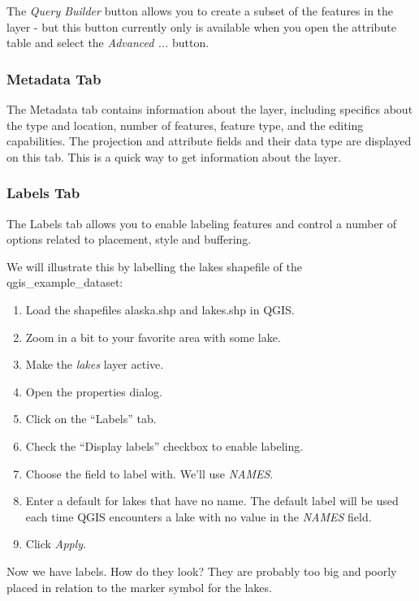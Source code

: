 The \textsl{Query Builder} button allows you to create a subset of the features 
in the layer - but this button currently only is available when you open the 
attribute table and select the \textsl{Advanced ...} button.

\subsubsection{Metadata Tab}

The Metadata tab contains information about the layer, including specifics
about the type and location, number of features, feature type, and the editing
capabilities. The projection and attribute fields and their data type are displayed 
on this tab. This is a quick way to get information about the layer.

\subsubsection{Labels Tab}

The Labels tab allows you to enable labeling features and control a number of
options related to placement, style and buffering.

We will illustrate this by labelling the lakes shapefile of the qgis\_example\_dataset:

\begin{enumerate}
\item Load the shapefiles alaska.shp and lakes.shp in QGIS.
\item Zoom in a bit to your favorite area with some lake.
\item Make the \textsl{lakes} layer active.
\item Open the properties dialog.
\item Click on the ``Labels'' tab.
\item Check the ``Display labels'' checkbox to enable labeling.
\item Choose the field to label with. We'll use \textsl{NAMES}.
\item Enter a default for lakes that have no name. The default label will be
  used each time QGIS encounters a lake with no value in the \textsl{NAMES} field.
\item Click \textsl{Apply}.
\end{enumerate} 

Now we have labels. How do they look? They are probably too big and poorly
placed in relation to the marker symbol for the lakes.

